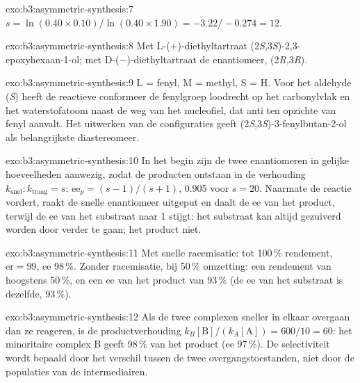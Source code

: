 \begin{solution}{exo:b3:asymmetric-synthesis:7}
$s = \ln(0.40 \times 0.10)/\ln(0.40 \times 1.90) = -3.22/-0.274 = 12$.
\end{solution}

\begin{solution}{exo:b3:asymmetric-synthesis:8}
Met L-($+$)-diethyltartraat (2\textit{S},3\textit{S})-2,3-epoxyhexaan-1-ol; met D-($-$)-diethyltartraat de
enantiomeer, (2\textit{R},3\textit{R}).
\end{solution}

\begin{solution}{exo:b3:asymmetric-synthesis:9}
L = fenyl, M = methyl, S = H. Voor het aldehyde (\textit{S}) heeft de reactieve conformeer de fenylgroep
loodrecht op het carbonylvlak en het waterstofatoom naast de weg van het
nucleofiel, dat anti ten opzichte van fenyl aanvalt. Het uitwerken van de
configuraties geeft
(2\textit{S},3\textit{S})-3-fenylbutan-2-ol als belangrijkste diastereomeer.
\end{solution}

\begin{solution}{exo:b3:asymmetric-synthesis:10}
In het begin zijn de twee enantiomeren in gelijke hoeveelheden aanwezig,
zodat de producten ontstaan in de verhouding $k_{\mathrm{snel}} : k_{\mathrm{traag}} = s$: $\mathrm{ee}_p = (s - 1)/(s + 1)$, 0.905 voor $s = 20$. Naarmate de reactie vordert,
raakt de snelle enantiomeer uitgeput en daalt de ee van het product,
terwijl de ee van het substraat naar 1 stijgt: het substraat kan altijd
gezuiverd worden door verder te gaan; het product niet.
\end{solution}

\begin{solution}{exo:b3:asymmetric-synthesis:11}
Met snelle racemisatie: tot 100\,\% rendement, $\mathrm{er} = 99$, ee 98\,\%. Zonder racemisatie, bij 50\,\%
omzetting: een rendement van hoogstens 50\,\%, en een ee van het product
van 93\,\% (de ee van het substraat is dezelfde, 93\,\%).
\end{solution}

\begin{solution}{exo:b3:asymmetric-synthesis:12}
Als de twee complexen sneller in elkaar overgaan dan ze reageren, is de
productverhouding
$k_B[\mathrm B]/(k_A[\mathrm A]) = 600/10 = 60$: het minoritaire complex B geeft 98\,\% van het product (ee 97\,\%). De
selectiviteit wordt bepaald door het verschil tussen de twee
overgangstoestanden, niet door de populaties van de intermediairen.
\end{solution}

